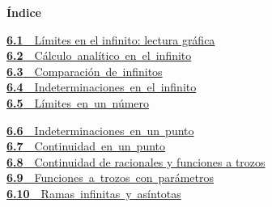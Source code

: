 \documentclass[11pt,a4paper]{article}
\begin{document}
\begin{tcolorbox}[colback=fmsurface,colframe=fmsurface,arc=3mm,left=4mm,right=4mm,top=2mm,bottom=2mm]
\small\textbf{Índice}\par\smallskip
\begin{minipage}[t]{0.49\linewidth}\small \hyperlink{sec1}{\textbf{\color{fmgreen}6.1}\ \ Límites en el infinito: lectura gráfica}\\[3pt]
\mbox{\hyperlink{sec2}{\textbf{\color{fmgreen}6.2}\ \ Cálculo analítico en el infinito}}\\[3pt]
\mbox{\hyperlink{sec3}{\textbf{\color{fmgreen}6.3}\ \ Comparación de infinitos}}\\[3pt]
\mbox{\hyperlink{sec4}{\textbf{\color{fmgreen}6.4}\ \ Indeterminaciones en el infinito}}\\[3pt]
\mbox{\hyperlink{sec5}{\textbf{\color{fmgreen}6.5}\ \ Límites en un número}}\\[3pt]\end{minipage}\hfill\begin{minipage}[t]{0.49\linewidth}\small \mbox{\hyperlink{sec6}{\textbf{\color{fmgreen}6.6}\ \ Indeterminaciones en un punto}}\\[3pt]
\mbox{\hyperlink{sec7}{\textbf{\color{fmgreen}6.7}\ \ Continuidad en un punto}}\\[3pt]
\hyperlink{sec8}{\textbf{\color{fmgreen}6.8}\ \ Continuidad de racionales y funciones a trozos}\\[3pt]
\mbox{\hyperlink{sec9}{\textbf{\color{fmgreen}6.9}\ \ Funciones a trozos con parámetros}}\\[3pt]
\mbox{\hyperlink{sec10}{\textbf{\color{fmgreen}6.10}\ \ Ramas infinitas y asíntotas}}\\[3pt]\end{minipage}
\end{tcolorbox}

\Needspace{5.7cm}
\end{document}
